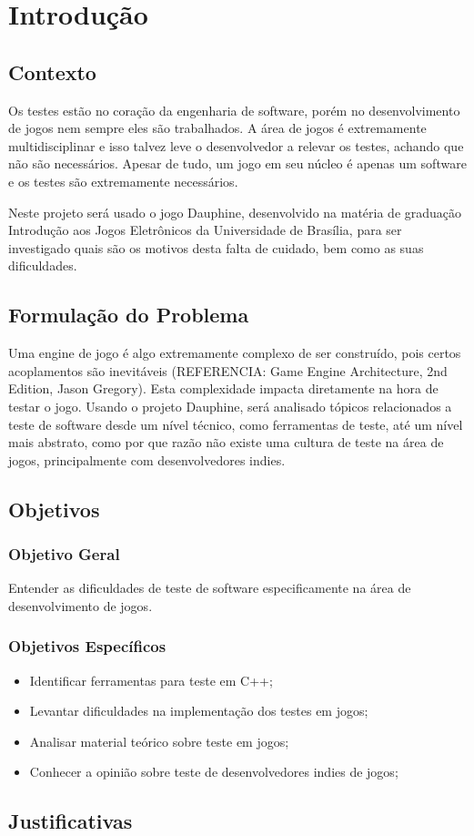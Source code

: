 \chapter[Introdução]{Introdução}

\section{Contexto}

Os testes estão no coração da engenharia de software, porém no desenvolvimento de jogos nem sempre eles são trabalhados. A área de jogos é extremamente multidisciplinar e isso talvez leve o desenvolvedor a relevar os testes, achando que não são necessários. Apesar de tudo, um jogo em seu núcleo é apenas um software e os testes são extremamente necessários.

Neste projeto será usado o jogo Dauphine, desenvolvido na matéria de graduação Introdução aos Jogos Eletrônicos da Universidade de Brasília, para ser investigado quais são os motivos desta falta de cuidado, bem como as suas dificuldades.

\section{Formulação do Problema}

Uma engine de jogo é algo extremamente complexo de ser construído, pois certos acoplamentos são inevitáveis (REFERENCIA: Game Engine Architecture, 2nd Edition, Jason Gregory). Esta complexidade impacta diretamente na hora de testar o jogo. Usando o projeto Dauphine, será analisado tópicos relacionados a teste de software desde um nível técnico, como ferramentas de teste, até um nível mais abstrato, como por que razão não existe uma cultura de teste na área de jogos, principalmente com desenvolvedores indies.

\section{Objetivos}

\subsection{Objetivo Geral}
Entender as dificuldades de teste de software especificamente na área de desenvolvimento de jogos.

\subsection{Objetivos Específicos}
\begin{itemize}
\item Identificar ferramentas para teste em C++;
\item Levantar dificuldades na implementação dos testes em jogos;
\item Analisar material teórico sobre teste em jogos;
\item Conhecer a opinião sobre teste de desenvolvedores indies de jogos;
\end{itemize}

\section{Justificativas}


